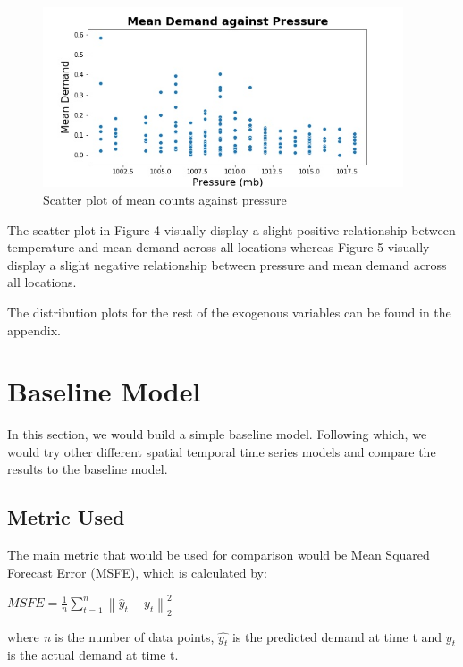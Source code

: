 \documentclass[12pt, letterpaper] {article}
\begin{document}
\begin{figure}[H]
    \centering
    \includegraphics[width=0.95\textwidth, height=0.32\textheight]{Images/pressure_mean_demand.jpg}
    \caption{Scatter plot of mean counts against pressure}
    \label{fig:Scatter plot of mean counts against pressure}
\end{figure}

\noindent The scatter plot in Figure 4 visually display a slight positive relationship between temperature and mean demand across all locations whereas Figure 5 visually display a slight negative relationship between pressure and mean demand across all locations. 

\noindent The distribution plots for the rest of the exogenous variables can be found in the appendix. 


\section{Baseline Model}
In this section, we would build a simple baseline model. Following which, we would try other different spatial temporal time series models and compare the results to the baseline model. 

\subsection{Metric Used}
The main metric that would be used for comparison would be Mean Squared Forecast Error (MSFE), which is calculated by:

\begin{center}
    $\displaystyle MSFE=\frac{1}{n}\sum_{t=1}^{n}\left \| \hat{y}_{t} - y_{t} \right \|_{2}^{2}$
\end{center}
where \textit{n} is the number of data points, $\hat{y_t}$ is the predicted demand at time t and ${y_t}$ is the actual demand at time t.
\end{document}
